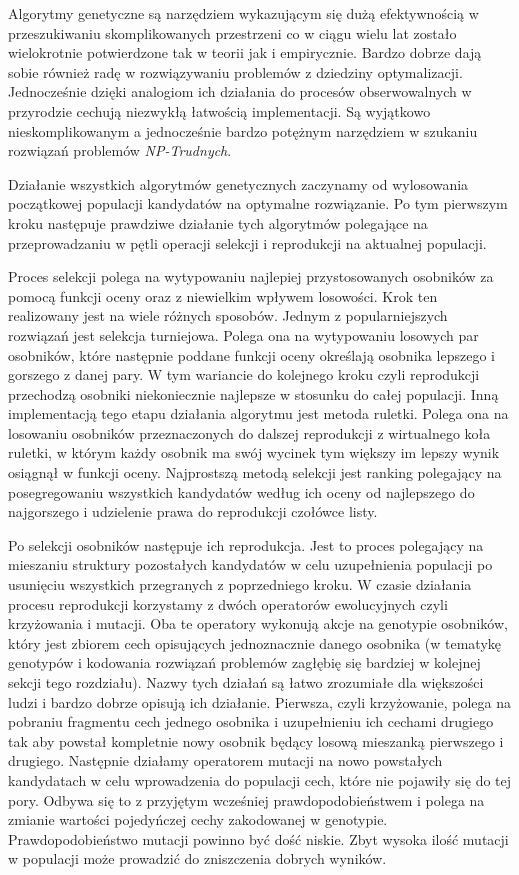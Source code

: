 \documentclass[12pt, oneside, a4paper]{report}
\begin{document}
Algorytmy genetyczne są narzędziem wykazującym się dużą efektywnością w przeszukiwaniu skomplikowanych przestrzeni co w ciągu wielu lat zostało wielokrotnie potwierdzone tak w teorii jak i empirycznie. Bardzo dobrze dają sobie również radę w rozwiązywaniu problemów z dziedziny optymalizacji. Jednocześnie dzięki analogiom ich działania do procesów obserwowalnych w przyrodzie cechują niezwykłą łatwością implementacji. Są wyjątkowo nieskomplikowanym a jednocześnie bardzo potężnym narzędziem w szukaniu rozwiązań problemów \textit{NP-Trudnych}.

Działanie wszystkich algorytmów genetycznych zaczynamy od wylosowania początkowej populacji kandydatów na optymalne rozwiązanie. Po tym pierwszym kroku następuje prawdziwe działanie tych algorytmów polegające na przeprowadzaniu w pętli operacji selekcji i reprodukcji na aktualnej populacji. 

Proces selekcji polega na wytypowaniu najlepiej przystosowanych osobników za pomocą funkcji oceny oraz z niewielkim wpływem losowości. Krok ten realizowany jest na wiele różnych sposobów. Jednym z popularniejszych rozwiązań jest selekcja turniejowa. Polega ona na wytypowaniu losowych par osobników, które następnie poddane funkcji oceny określają osobnika lepszego i gorszego z danej pary. W tym wariancie do kolejnego kroku czyli reprodukcji przechodzą osobniki niekoniecznie najlepsze w stosunku do całej populacji. Inną implementacją tego etapu działania algorytmu jest metoda ruletki. Polega ona na losowaniu osobników przeznaczonych do dalszej reprodukcji z wirtualnego koła ruletki, w którym każdy osobnik ma swój wycinek tym większy im lepszy wynik osiągnął w funkcji oceny. Najprostszą metodą selekcji jest ranking polegający na posegregowaniu wszystkich kandydatów według ich oceny od najlepszego do najgorszego i udzielenie prawa do reprodukcji czołówce listy.

Po selekcji osobników następuje ich reprodukcja. Jest to proces polegający na mieszaniu struktury pozostałych kandydatów w celu uzupełnienia populacji po usunięciu wszystkich przegranych z poprzedniego kroku. W czasie działania procesu reprodukcji korzystamy z dwóch operatorów ewolucyjnych czyli krzyżowania i mutacji. Oba te operatory wykonują akcje na genotypie osobników, który jest zbiorem cech opisujących jednoznacznie danego osobnika (w tematykę genotypów i kodowania rozwiązań problemów zagłębię się bardziej w kolejnej sekcji tego rozdziału). Nazwy tych działań są łatwo zrozumiałe dla większości ludzi i bardzo dobrze opisują ich działanie. Pierwsza, czyli krzyżowanie, polega na pobraniu fragmentu cech jednego osobnika i uzupełnieniu ich cechami drugiego tak aby powstał kompletnie nowy osobnik będący losową mieszanką pierwszego i drugiego. Następnie działamy operatorem mutacji na nowo powstałych kandydatach w celu wprowadzenia do populacji cech, które nie pojawiły się do tej pory. Odbywa się to z przyjętym wcześniej prawdopodobieństwem i polega na zmianie wartości pojedyńczej cechy zakodowanej w genotypie. Prawdopodobieństwo mutacji powinno być dość niskie. Zbyt wysoka ilość mutacji w populacji może prowadzić do zniszczenia dobrych wyników.
\end{document}
